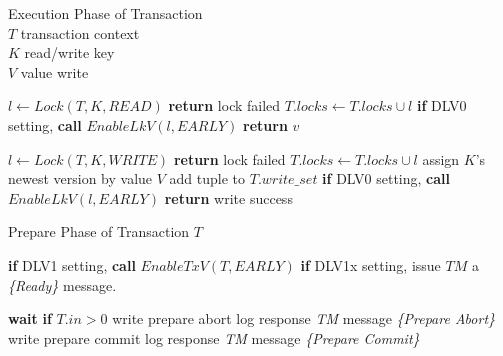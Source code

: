 \documentclass[conference]{IEEEtran}
\begin{document}
\begin{algorithm}[!h]

  \caption{Execution Phase of Transaction \\
  ${T}$ transaction context \\ 
  ${K}$ read/write key \\
  ${V}$ value write}

  \begin{algorithmic}[1]
    \State ${l \gets Lock(T, K, READ)}$
      \State \textbf{return} lock failed 
    \Else
      \State ${T.locks \gets T.locks \cup l}$
      \State \textbf{if} DLV0 setting, \textbf{call} $EnableLkV(l, EARLY)$
      \State \textbf{return} ${v}$
    \EndIf
  \EndFunction
  \label{func:read}
  \end{algorithmic}


  \begin{algorithmic}[1]
  \State ${l \gets Lock(T, K, WRITE)}$
    \State \textbf{return} lock failed
  \Else
    \State ${T.locks \gets T.locks \cup l}$
    \State assign ${K}$'s newest version by value ${V}$
    \State add tuple to ${T.write\_set}$
    \State \textbf{if} DLV0 setting, \textbf{call} $EnableLkV(l, EARLY)$
    \State \textbf{return} write success
  \EndIf
  \label{func:write}
  \EndFunction
  \end{algorithmic}
  \label{alg:execution_phase}
\end{algorithm}

\begin{algorithm}[!h]
  \caption{Prepare Phase of Transaction ${T}$}
  \begin{algorithmic}[1]
      \State \textbf{if} DLV1 setting, \textbf{call} ${EnableTxV(T, EARLY)}$
      \State \textbf{if} DLV1x setting, issue $TM$ a \emph{\{Ready\}} message.


    \State \textbf{wait} \textbf{if} ${T.in > 0}$
      \State write prepare abort log
      \State response \emph{TM} message \emph{\{Prepare Abort\}} 
      \State write prepare commit log
      \State response \emph{TM} message \emph{\{Prepare Commit\}} 
    \EndIf
  \EndFunction
  \end{algorithmic}
  \label{alg:prepare_phase}
\end{algorithm}
\end{document}
